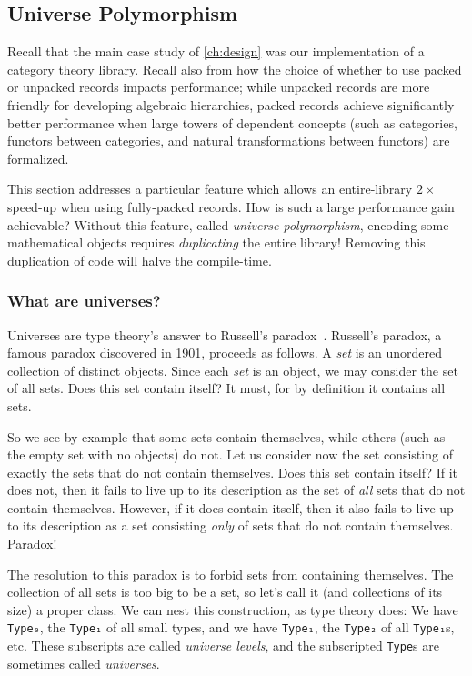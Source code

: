 \subsection{Universe Polymorphism}\label{sec:fixes:theory:univ-poly}\label{sec:univ-poly}

Recall that the main case study of \autoref{ch:design} was our implementation of a category theory library.
Recall also from  how the choice of whether to use packed or unpacked records impacts performance; while unpacked records are more friendly for developing algebraic hierarchies, packed records achieve significantly better performance when large towers of dependent concepts (such as categories, functors between categories, and natural transformations between functors) are formalized.

This section addresses a particular feature which allows an entire-library $2\times$ speed-up when using fully-packed records.
How is such a large performance gain achievable?
Without this feature, called \emph{universe polymorphism}, encoding some mathematical objects requires \emph{duplicating} the entire library!
Removing this duplication of code will halve the compile-time.

\subsubsection{What are universes?}\label{sec:universes-def}
Universes are type theory's answer to Russell's paradox~\cite{sep-russell-paradox}.
Russell's paradox, a famous paradox discovered in 1901, proceeds as follows.
A \emph{set} is an unordered collection of distinct objects.
Since each \emph{set} is an object, we may consider the set of all sets.
Does this set contain itself?
It must, for by definition it contains all sets.

So we see by example that some sets contain themselves, while others (such as the empty set with no objects) do not.
Let us consider now the set consisting of exactly the sets that do not contain themselves.
Does this set contain itself?
If it does not, then it fails to live up to its description as the set of \emph{all} sets that do not contain themselves.
However, if it does contain itself, then it also fails to live up to its description as a set consisting \emph{only} of sets that do not contain themselves.
Paradox!

The resolution to this paradox is to forbid sets from containing themselves.
The collection of all sets is too big to be a set, so let's call it (and collections of its size) a proper class.
We can nest this construction, as type theory does:
We have \texttt{Type₀}, the \texttt{Type₁} of all small types, and we have \texttt{Type₁}, the \texttt{Type₂} of all \texttt{Type₁}s, etc.
These subscripts are called \emph{universe levels}, and the subscripted \texttt{Type}s are sometimes called \emph{universes}.

